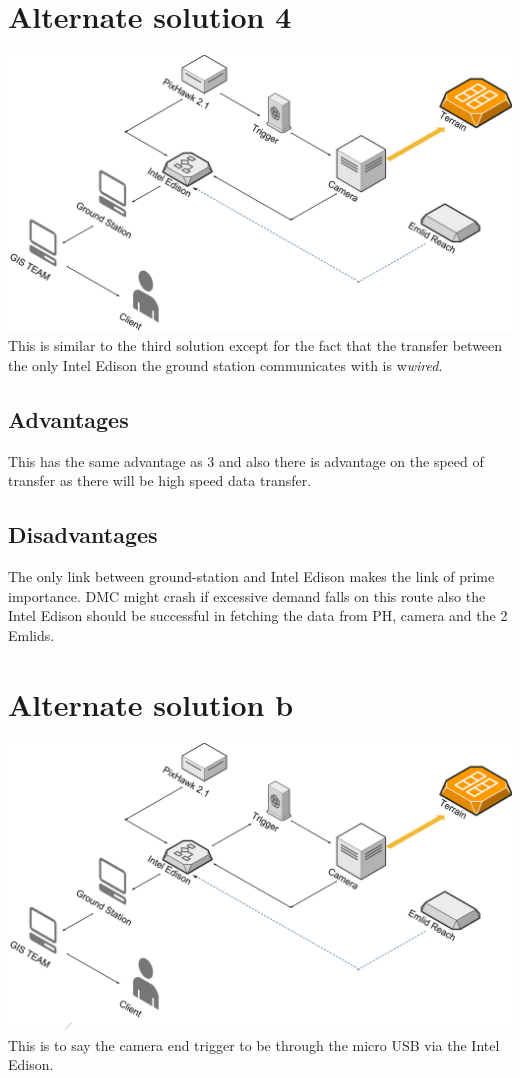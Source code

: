\documentclass[12pt]{report}
\begin{document}
\section{Alternate solution 4}
 \includegraphics[width=\linewidth]{Alternative_Solution4.jpg}
 \\
 This is similar to the third solution except for the fact that the transfer between the only Intel Edison the ground station communicates with is w\emph{wired}.
\subsection{Advantages}
This has the same advantage as 3 and also there is advantage on the speed of transfer as there will be high speed data transfer.
\subsection{Disadvantages} 
 The only link between ground-station and Intel Edison makes the link of prime importance. DMC might crash if excessive demand falls on this route also the Intel Edison should be successful in fetching the data from PH, camera and the 2 Emlids.
 
\section{Alternate solution b}
 \includegraphics[width=\linewidth]{Alternative_Solution_b.jpg}
This is to say the camera end trigger to be through the micro USB via the Intel Edison. 
\end{document}
